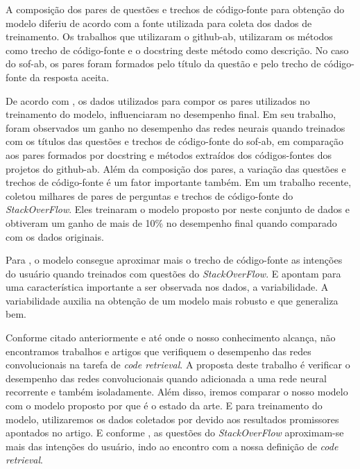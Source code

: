 A composição dos pares de questões e trechos de código-fonte para obtenção do modelo diferiu de acordo com a fonte utilizada para coleta dos dados de treinamento. Os trabalhos que utilizaram o \acrfull{github-ab}, utilizaram os métodos como trecho de código-fonte e o \gls{docstring} deste método como descrição. No caso do \acrfull{sof-ab}, os pares foram formados pelo título da questão e pelo trecho de código-fonte da resposta aceita.

De acordo com \cite{cambronero-deep-learning-code-search:2019}, os dados utilizados para compor os pares utilizados no treinamento do modelo, influenciaram no desempenho final. Em seu trabalho, foram observados um ganho no desempenho das redes neurais quando treinados com os títulos das questões e trechos de código-fonte do \acrfull{sof-ab}, em comparação aos pares formados por \gls{docstring} e métodos extraídos dos códigos-fontes dos projetos do \acrfull{github-ab}. Além da composição dos pares, a variação das questões e trechos de código-fonte é um fator importante também. Em um trabalho recente, \cite{yao-2018} coletou milhares de pares de perguntas e trechos de código-fonte do \textit{StackOverFlow}. Eles treinaram o modelo proposto por \cite{iyer-etal-2016-summarizing} neste conjunto de dados e obtiveram um ganho de mais de 10\% no desempenho final quando comparado com os dados originais.

Para \cite{cambronero-deep-learning-code-search:2019}, o modelo consegue aproximar mais o trecho de código-fonte as intenções do usuário quando treinados com questões do \textit{StackOverFlow}. E \cite{yao-2018} apontam para uma característica importante a ser observada nos dados, a variabilidade. A variabilidade auxilia na obtenção de um modelo mais robusto e que generaliza bem.

Conforme citado anteriormente e até onde o nosso conhecimento alcança, não encontramos trabalhos e artigos que verifiquem o desempenho das redes convolucionais na tarefa de \textit{code retrieval}. A proposta deste trabalho é verificar o desempenho das redes convolucionais quando adicionada a uma rede neural recorrente e também isoladamente. Além disso, iremos comparar o nosso modelo com o modelo proposto por \cite{cambronero-deep-learning-code-search:2019} que é o estado da arte. E para treinamento do modelo, utilizaremos os dados coletados por \cite{yao-2018} devido aos resultados promissores apontados no artigo. E conforme \cite{cambronero-deep-learning-code-search:2019}, as questões do \textit{StackOverFlow} aproximam-se mais das intenções do usuário, indo ao encontro com a nossa definição de \textit{code retrieval}.